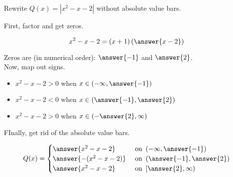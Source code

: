 \documentclass{ximera}
\author{Lee Wayand}
\begin{document}
\begin{example}











Rewrite $Q(x) = | x^2 - x - 2 |$ without absolute value bars.



\begin{explanation}


First, factor and get zeros.

\[
x^2 - x - 2 = (x+1)\left( \answer{x-2} \right)
\]



Zeros are (in numerical order):  $\answer{-1}$  and  $\answer{2}$. \\





Now, map out signs.


\begin{itemize}
\item $x^2 - x - 2 > 0$ when $x \in \left( -\infty, \answer{-1} \right)$
\item $x^2 - x - 2 < 0$ when $x \in ( \answer{-1}, \answer{2} )$
\item $x^2 - x - 2 > 0$ when $x \in \left( -\answer{2} , \infty \right)$
\end{itemize}







FInally, get rid of the absolute value bars.



\[
Q(x) = 
\begin{cases}
  \answer{x^2 - x - 2} & \text{ on } \left( -\infty, \answer{-1} \right)   \\
  \answer{-(x^2 - x - 2)} & \text{ on } \left( \answer{-1}, \answer{2} \right)   \\
  \answer{x^2 - x - 2}  & \text{ on } \left[ \answer{2}, \infty \right)
\end{cases}
\]






\end{explanation}






\end{example}
\end{document}
